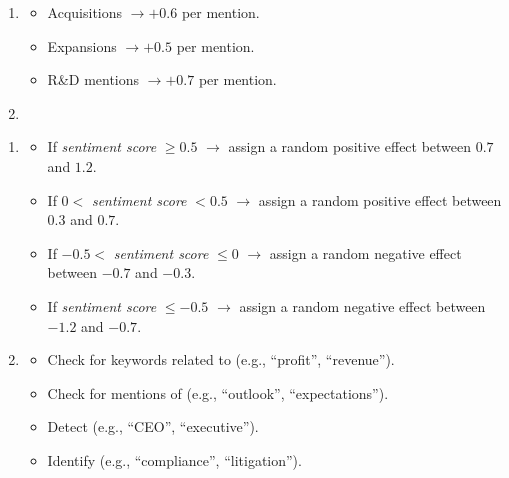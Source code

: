 \documentclass[3p,times,procedia]{elsarticle}
\begin{document}
\begin{enumerate}
    \item {}
    \begin{itemize}
        \item Acquisitions $\rightarrow +0.6$ per mention.
        \item Expansions $\rightarrow +0.5$ per mention.
        \item R\&D mentions $\rightarrow +0.7$ per mention.
    \end{itemize}

    \item {}

\end{enumerate}
 \cite{TETLOCK2007}
\begin{enumerate}
    \item {}
    \begin{itemize}
    \item If \textit{sentiment score} $\geq 0.5$ $\rightarrow$ assign a random positive effect between $0.7$ and $1.2$.
    \item If $0 <$ \textit{sentiment score} $< 0.5$ $\rightarrow$ assign a random positive effect between $0.3$ and $0.7$.
    \item If $-0.5 <$ \textit{sentiment score} $\leq 0$ $\rightarrow$ assign a random negative effect between $-0.7$ and $-0.3$.
    \item If \textit{sentiment score} $\leq -0.5$ $\rightarrow$ assign a random negative effect between $-1.2$ and $-0.7$.
\end{itemize}


    \item {}
    \begin{itemize}
        \item Check for keywords related to  (e.g., ``profit'', ``revenue'').
        \item Check for mentions of  (e.g., ``outlook'', ``expectations'').
        \item Detect  (e.g., ``CEO'', ``executive'').
        \item Identify  (e.g., ``compliance'', ``litigation'').
    \end{itemize}


\end{enumerate}
\end{document}

